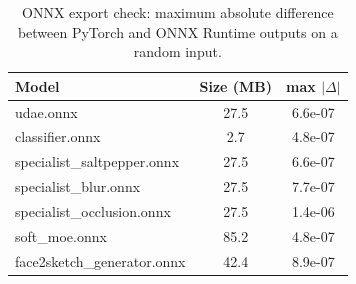 \begin{table}[t]\centering\caption{ONNX export check: maximum absolute difference between PyTorch and ONNX Runtime outputs on a random input.}\label{tab:onnx}
\setlength{\tabcolsep}{3pt}\begin{tabular}{lcc}\toprule Model & Size (MB) & max $|\Delta|$\\\midrule
udae.onnx & 27.5 & 6.6e-07\\
classifier.onnx & 2.7 & 4.8e-07\\
specialist\_saltpepper.onnx & 27.5 & 6.6e-07\\
specialist\_blur.onnx & 27.5 & 7.7e-07\\
specialist\_occlusion.onnx & 27.5 & 1.4e-06\\
soft\_moe.onnx & 85.2 & 4.8e-07\\
face2sketch\_generator.onnx & 42.4 & 8.9e-07\\
\bottomrule\end{tabular}\end{table}